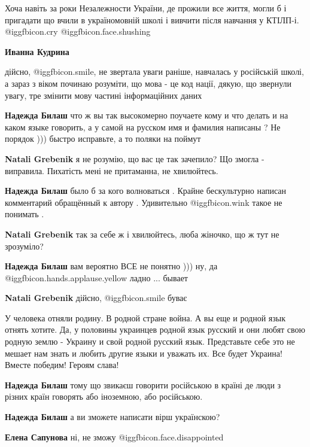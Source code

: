 \begin{itemize}
\begin{itemize}
Хоча навіть за роки Незалежности України, де прожили все життя, могли б і
пригадати що вчили в україномовній школі і вивчити після навчання у
КТІЛП-і. @igg{fbicon.cry}  @igg{fbicon.face.shushing} 

\textbf{Иванна Кудрина} 

дійсно,  @igg{fbicon.smile}, не звертала уваги раніше, навчалась у російській школі, а зараз з
віком починаю розуміти, що мова - це код нації, дякую, що звернули увагу, тре
змінити мову частині інформаційних даних

\textbf{Надежда Билаш} что ж вы так высокомерно поучаете кому и что делать и на каком
языке говорить, а у самой на русском имя и фамилия написаны ? Не порядок )))
быстро исправьте, а то поляки на поймут

\begin{itemize} %
\textbf{Natali Grebenik} я не розумію, що вас це так зачепило? Що змогла - виправила. Пихатість мені не притаманна, не хвилюйтесь.

\textbf{Надежда Билаш} было б за кого волноваться . Крайне бескультурно написан комментарий обращённый к автору . Удивительно  @igg{fbicon.wink}  такое не понимать .

\textbf{Natali Grebenik} так за себе ж і хвилюйтесь, люба жіночко, що ж тут не зрозуміло?

\textbf{Надежда Билаш} вам вероятно ВСЕ не понятно ))) ну, да  @igg{fbicon.hands.applause.yellow}  ладно ... бывает

\textbf{Natali Grebenik} дійсно,  @igg{fbicon.smile}  буває
\end{itemize} %


У человека отняли родину. В родной стране война. А вы еще и родной язык отнять
хотите. Да, у половины украинцев родной язык русский и они любят свою родную
землю - Украину и свой родной русский язык. Представьте себе это не мешает нам
знать и любить другие языки и уважать их. Все будет Украина! Вместе победим!
Героям слава!


\textbf{Надежда Билаш} тому що звикаєш говорити російською в країні де люди з різних країн говорять або іноземною, або російською.

\textbf{Надежда Билаш} а ви зможете написати вірш українскою?

\begin{itemize} %
\textbf{Елена Сапунова} ні, не зможу  @igg{fbicon.face.disappointed} 


\end{itemize}
\end{itemize}
\end{itemize}
